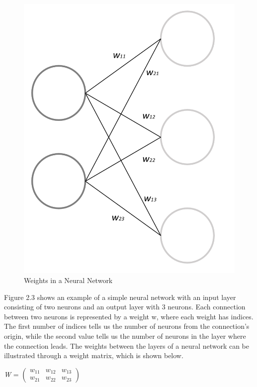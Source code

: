 \indent\newline 
\begin{figure}[H]
\centering
\includegraphics [scale=0.40,angle=360]{figures/weights.png}
\caption{Weights in a Neural Network}
\label{fig:weights}
\end{figure}

\indent\newline 
Figure 2.3 shows an example of a simple neural network with an input layer consisting of two neurons and an output layer with 3 neurons. Each connection between two neurons is represented by a weight w, where each weight has indices. The first number of indices tells us the number of neurons from the connection's origin, while the second value tells us the number of neurons in the layer where the connection leads. The weights between the layers of a neural network can be illustrated through a weight matrix, which is shown below. 
\indent\newline 
\begin{center}
\textit{W} = $\begin{pmatrix}
w_{11} & w_{12} & w_{13}\\
w_{21} & w_{22} & w_{23}
\end{pmatrix}$
\end{center}

